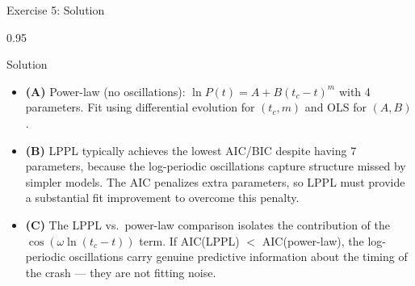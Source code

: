 \documentclass[9pt, aspectratio=169, t]{beamer}
\begin{document}
\begin{frame}{Exercise 5: Solution}
    \begin{cminipage}{0.95\textwidth}
    \begin{exampleblock}{Solution}
        {\small
        \begin{itemize}\setlength{\itemsep}{3pt}
            \item \textcolor{MainBlue}{\textbf{(A)}} Power-law (no oscillations): $\ln P(t) = A + B(t_c - t)^m$ with 4 parameters. Fit using differential evolution for $(t_c, m)$ and OLS for $(A, B)$.
            \item \textcolor{MainBlue}{\textbf{(B)}} LPPL typically achieves the lowest AIC/BIC despite having 7 parameters, because the log-periodic oscillations capture structure missed by simpler models. The AIC penalizes extra parameters, so LPPL must provide a substantial fit improvement to overcome this penalty.
            \item \textcolor{MainBlue}{\textbf{(C)}} The LPPL vs.\ power-law comparison isolates the contribution of the $\cos(\omega \ln(t_c - t))$ term. If AIC(LPPL) $<$ AIC(power-law), the log-periodic oscillations carry genuine predictive information about the timing of the crash --- they are not fitting noise.
        \end{itemize}
        }
    \end{exampleblock}
    \end{cminipage}
\end{frame}
\end{document}

